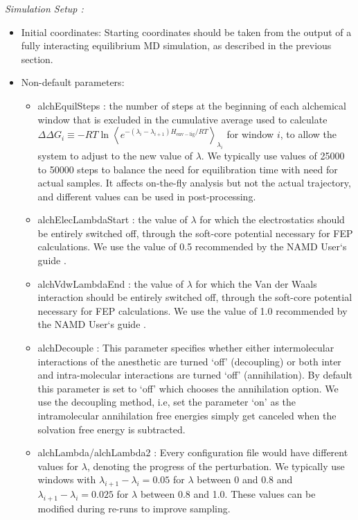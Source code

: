 \documentclass[12pt]{article}
\begin{document}
\noindent\textit{Simulation Setup :}
\begin{itemize}
\item Initial coordinates: Starting coordinates should be taken from the output of a fully interacting equilibrium MD simulation, as described in the previous section.  
\item Non-default parameters:
	\begin{itemize} 
	\item alchEquilSteps : the number of steps at the beginning of each alchemical window that is excluded in the cumulative  average used to calculate $\Delta\Delta G_{i} \equiv  -R T \ln \left \langle  e^{-( \lambda_{i} - \lambda_{i+1}) H_{\mathrm{env-lig}}/R T} \right \rangle_{\lambda_{i}}$ for window $i$, to allow the system to adjust to the new value of $\lambda$. We typically use values of 25000 to 50000 steps to balance the need for equilibration time with need for actual samples.  It affects on-the-fly analysis but not the actual trajectory, and different values can be used in post-processing. 
	\item alchElecLambdaStart : the value of $\lambda$ for which the electrostatics should be entirely switched off, through the soft-core potential necessary for FEP calculations.   We use the value of 0.5 recommended by the NAMD User`s guide \cite{Git---2017}.
	\item alchVdwLambdaEnd : the value of $\lambda$ for which the Van der Waals interaction should be entirely switched off, through the soft-core potential necessary for FEP calculations.   We use the value of 1.0 recommended by the NAMD User`s guide \cite{Git---2017}.
	\item alchDecouple : This parameter specifies whether either intermolecular interactions of the anesthetic are turned `off' (decoupling) or both inter and intra-molecular interactions are turned `off' (annihilation). By default this parameter is set to `off' which chooses the annihilation option. We use the decoupling method, i.e, set the parameter `on' as the intramolecular annihilation free energies simply get canceled when the solvation free energy is subtracted.
	\item alchLambda/alchLambda2 : Every configuration file would have different values for $\lambda$, denoting the progress of the perturbation. We typically use windows with $\lambda_{i+1} - \lambda_{i} = 0.05$ for $\lambda$ between 0 and 0.8 and $\lambda_{i+1} - \lambda_{i} = 0.025$ for $\lambda$ between 0.8 and 1.0. These values can be modified during re-runs to improve sampling.

\end{itemize}
\end{itemize}
\end{document}
